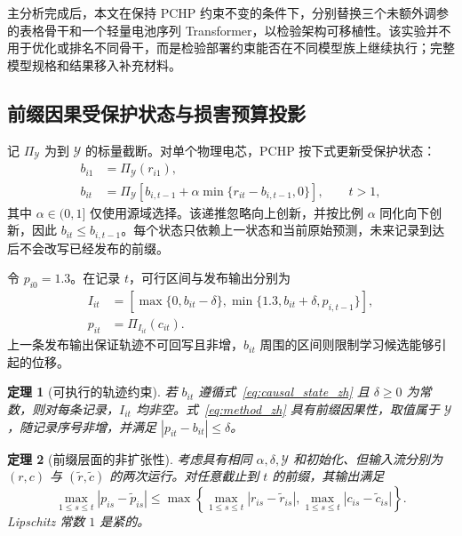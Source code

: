 \documentclass[UTF8,11pt]{ctexart}
\newtheorem{theorem}{定理}
\begin{document}
主分析完成后，本文在保持 PCHP 约束不变的条件下，分别替换三个未额外调参的表格骨干和一个轻量电池序列 Transformer，以检验架构可移植性。该实验并不用于优化或排名不同骨干，而是检验部署约束能否在不同模型族上继续执行；完整模型规格和结果移入补充材料。


\subsection{前缀因果受保护状态与损害预算投影}

记 \(\Pi_{\mathcal Y}\) 为到 \(\mathcal Y\) 的标量截断。对单个物理电芯，PCHP 按下式更新受保护状态：
\begin{align}
  b_{i1}&=\Pi_{\mathcal Y}(r_{i1}),\\
  b_{it}&=\Pi_{\mathcal Y}\!\left[b_{i,t-1}
  +\alpha\min\{r_{it}-b_{i,t-1},0\}\right],\qquad t>1,
  \label{eq:causal_state_zh}
\end{align}
其中 \(\alpha\in(0,1]\) 仅使用源域选择。该递推忽略向上创新，并按比例 \(\alpha\) 同化向下创新，因此 \(b_{it}\leq b_{i,t-1}\)。每个状态只依赖上一状态和当前原始预测，未来记录到达后不会改写已经发布的前缀。

令 \(p_{i0}=1.3\)。在记录 \(t\)，可行区间与发布输出分别为
\begin{align}
 I_{it}
 &=\left[\max\{0,b_{it}-\delta\},
 \min\{1.3,b_{it}+\delta,p_{i,t-1}\}\right],
 \label{eq:feasible_interval_zh}\\
 p_{it}&=\Pi_{I_{it}}(c_{it}).
 \label{eq:method_zh}
\end{align}
上一条发布输出保证轨迹不可回写且非增，\(b_{it}\) 周围的区间则限制学习候选能够引起的位移。

\begin{theorem}[可执行的轨迹约束]
\label{thm:pchp_zh}
若 \(b_{it}\) 遵循式~\eqref{eq:causal_state_zh} 且 \(\delta\geq0\) 为常数，则对每条记录，\(I_{it}\) 均非空。式~\eqref{eq:method_zh} 具有前缀因果性，取值属于 \(\mathcal Y\)，随记录序号非增，并满足 \(|p_{it}-b_{it}|\leq\delta\)。
\end{theorem}

\begin{theorem}[前缀层面的非扩张性]
\label{thm:nonexpansive_zh}
考虑具有相同 \(\alpha,\delta,\mathcal Y\) 和初始化、但输入流分别为 \((r,c)\) 与 \((\widetilde r,\widetilde c)\) 的两次运行。对任意截止到 \(t\) 的前缀，其输出满足
\begin{equation}
 \max_{1\leq s\leq t}|p_{is}-\widetilde p_{is}|
 \leq
 \max\!\left\{
 \max_{1\leq s\leq t}|r_{is}-\widetilde r_{is}|,
 \max_{1\leq s\leq t}|c_{is}-\widetilde c_{is}|
 \right\}.
 \label{eq:prefix_nonexpansive_zh}
\end{equation}
Lipschitz 常数 \(1\) 是紧的。
\end{theorem}
\end{document}
